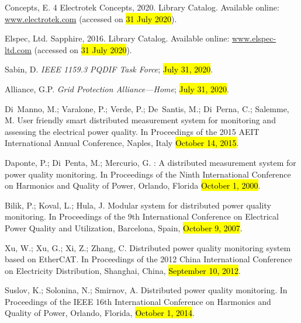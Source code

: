\documentclass[energies,article,accept,moreauthors,pdftex]{Definitions/mdpi}
\begin{document}
\begin{thebibliography}{999}
Concepts, E.
 4 {\textbar} {Electrotek} {Concepts}, 2020.
\newblock Library Catalog. Available online:  \url{www.electrotek.com}  (accessed on \hl{31 July 2020}).

{Elspec, Ltd}.
 {Sapphire}, 2016.
\newblock Library Catalog. Available online:  \url{www.elspec-ltd.com}  (accessed on \hl{31 July 2020}).

Sabin, D.
\newblock \emph{{IEEE} 1159.3 {PQDIF} {Task} {Force}}; \hl{July 31, 2020}.

Alliance, G.P.
\newblock \emph{Grid {Protection} {Alliance}---{Home}}; \hl{July 31, 2020}.

Di~Manno, M.; Varalone, P.; Verde, P.; De~Santis, M.; Di~Perna, C.; Salemme, M.
\newblock User friendly smart distributed measurement system for monitoring and
assessing the electrical power quality.
\newblock In Proceedings of the 2015 {AEIT} {International} {Annual}
{Conference}, Naples, Italy \hl{October 14, 2015}.

Daponte, P.; Di~Penta, M.; Mercurio, G.
: A distributed measurement system for power quality
monitoring.
\newblock In {Proceedings of the } Ninth {International} {Conference} on {Harmonics} and {Quality} of
{Power}, Orlando, Florida \hl{October 1, 2000}.

Bilik, P.; Koval, L.; Hula, J.
\newblock Modular system for distributed power quality monitoring.
\newblock In {Proceedings of the } 9th {International} {Conference} on {Electrical} {Power} {Quality}
and {Utilization}, Barcelona, Spain, \hl{October 9, 2007}.

Xu, W.; Xu, G.; Xi, Z.; Zhang, C.
\newblock Distributed power quality monitoring system based on {EtherCAT}.
\newblock In {Proceedings of the }2012 {China} {International} {Conference} on {Electricity}
{Distribution}, Shanghai, China, \hl{September 10, 2012}.

Suslov, K.; Solonina, N.; Smirnov, A.
\newblock Distributed power quality monitoring.
\newblock In {Proceedings of the } {IEEE} 16th {International} {Conference} on {Harmonics} and
{Quality} of {Power}, Orlando, Florida, \hl{October 1, 2014}.


\end{thebibliography}
\end{document}
